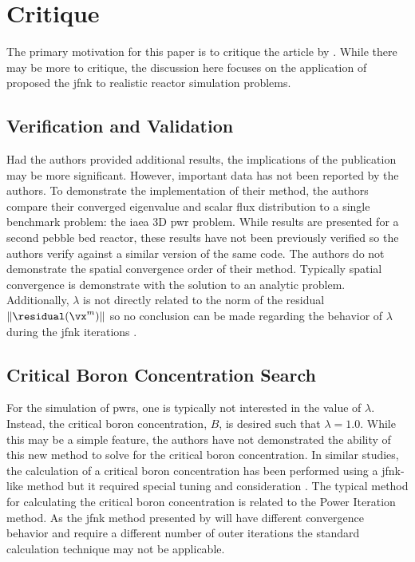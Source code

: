 \section{Critique}
\label{sec:critique}
  The primary motivation for this paper is to critique the article by
  \citeauthor{qe2paper}. While there may be more to critique, the discussion
  here focuses on the application of proposed the \gls{jfnk} to realistic
  reactor simulation problems.

  \subsection{Verification and Validation}
    Had the authors provided additional results, the implications of the
    publication may be more significant. However, important data has not been
    reported by the authors. To demonstrate the implementation of their method,
    the authors compare their converged eigenvalue and scalar flux distribution 
    to a single benchmark problem: the \gls{iaea} 3D \gls{pwr} problem. While
    results are presented for a second pebble bed reactor, these results have
    not been previously verified so the authors verify against a similar version
    of the same code. The authors do not demonstrate the spatial convergence
    order of their method. Typically spatial convergence is demonstrate with the
    solution to an analytic problem. Additionally, $\lambda$ is not directly
    related to the norm of the residual $\| \residual (\vx^m) \|$ so no
    conclusion can be made regarding the behavior of $\lambda$ during the
    \gls{jfnk} iterations \cite{caslJFNK}.

  \subsection{Critical Boron Concentration Search}
    For the simulation of \glspl{pwr}, one is typically not interested in the
    value of $\lambda$. Instead, the critical boron concentration, $B$, is
    desired such that $\lambda=1.0$. While this may be a simple feature, the
    authors have not demonstrated the ability of this new method to solve for
    the critical boron concentration. In similar studies, the calculation of a
    critical boron concentration has been performed using a \gls{jfnk}-like
    method but it required special tuning and consideration \cite{caslJFNK}. The
    typical method for calculating the critical boron concentration is related
    to the Power Iteration method. As the \gls{jfnk} method presented by
    \citeauthor{qe2paper} will have different convergence behavior and require a
    different number of outer iterations the standard calculation technique may
    not be applicable.

